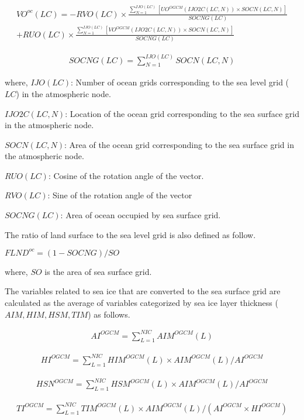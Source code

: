 \begin{eqnarray} VO^{oc}(LC)=-RVO(LC) \times  \frac{\sum_{N=1}^{IJO(LC)}[UO^{OGCM}(IJO2C(LC,N)) \times SOCN(LC,N)]}{SOCNG(LC)} \\ + RUO(LC) \times  \frac{\sum_{N=1}^{IJO(LC)}[VO^{OGCM}(IJO2C(LC,N)) \times SOCN(LC,N)]}{SOCNG(LC)} \end{eqnarray}

\begin{eqnarray} SOCNG(LC)= \sum_{N=1}^{IJO(LC)}SOCN(LC,N) \end{eqnarray}

where, \(IJO(LC)\): Number of ocean grids corresponding to the sea level grid (\(LC\)) in the atmospheric node.

\(IJO2C(LC,N)\): Location of the ocean grid corresponding to the sea surface grid in the atmospheric node.

\(SOCN(LC,N)\): Area of the ocean grid corresponding to the sea surface grid in the atmospheric node.

\(RUO(LC)\): Cosine of the rotation angle of the vector.

\(RVO(LC)\): Sine of the rotation angle of the vector

\(SOCNG(LC)\): Area of ocean occupied by sea surface grid.

The ratio of land surface to the sea level grid is also defined as follow.

\(FLND^{oc}=(1-SOCNG)/SO\)

where, \(SO\) is the area of sea surface grid.

The variables related to sea ice that are converted to the sea surface grid are calculated as the average of variables categorized by sea ice layer thickness (\(AIM,HIM,HSM,TIM\)) as follows.

\begin{eqnarray} AI^{OGCM} = \sum_{L=1}^{NIC} AIM^{OGCM}(L) \end{eqnarray}

\begin{eqnarray} HI^{OGCM} = \sum_{L=1}^{NIC} HIM^{OGCM}(L) \times AIM^{OGCM}(L)/AI^{OGCM} \end{eqnarray}

\begin{eqnarray} HSN^{OGCM} = \sum_{L=1}^{NIC} HSM^{OGCM}(L) \times AIM^{OGCM}(L)/AI^{OGCM} \end{eqnarray}

\begin{eqnarray} TI^{OGCM} = \sum_{L=1}^{NIC} TIM^{OGCM}(L) \times AIM^{OGCM}(L)/(AI^{OGCM} \times HI^{OGCM}) \end{eqnarray}

